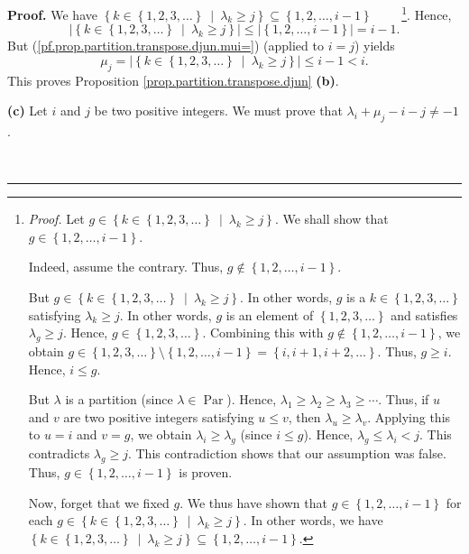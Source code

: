 \documentclass[numbers=enddot,12pt,final,onecolumn,notitlepage]{scrartcl}%
\theoremstyle{definition}
\newenvironment{proof}[1][Proof]{\noindent\textbf{#1.} }{\ \rule{0.5em}{0.5em}}
\newenvironment{verlong}{}{}
\begin{document}
\begin{verlong}
\begin{proof}
We have $\left\{  k\in\left\{  1,2,3,\ldots\right\}  \ \mid\ \lambda_{k}\geq
j\right\}  \subseteq\left\{  1,2,\ldots,i-1\right\}  $%
\ \ \ \ \footnote{\textit{Proof.} Let $g\in\left\{  k\in\left\{
1,2,3,\ldots\right\}  \ \mid\ \lambda_{k}\geq j\right\}  $. We shall show that
$g\in\left\{  1,2,\ldots,i-1\right\}  $.
\par
Indeed, assume the contrary. Thus, $g\notin\left\{  1,2,\ldots,i-1\right\}  $.
\par
But $g\in\left\{  k\in\left\{  1,2,3,\ldots\right\}  \ \mid\ \lambda_{k}\geq
j\right\}  $. In other words, $g$ is a $k\in\left\{  1,2,3,\ldots\right\}  $
satisfying $\lambda_{k}\geq j$. In other words, $g$ is an element of $\left\{
1,2,3,\ldots\right\}  $ and satisfies $\lambda_{g}\geq j$. Hence,
$g\in\left\{  1,2,3,\ldots\right\}  $. Combining this with $g\notin\left\{
1,2,\ldots,i-1\right\}  $, we obtain $g\in\left\{  1,2,3,\ldots\right\}
\setminus\left\{  1,2,\ldots,i-1\right\}  =\left\{  i,i+1,i+2,\ldots\right\}
$. Thus, $g\geq i$. Hence, $i\leq g$.
\par
But $\lambda$ is a partition (since $\lambda\in\operatorname*{Par}$). Hence,
$\lambda_{1}\geq\lambda_{2}\geq\lambda_{3}\geq\cdots$. Thus, if $u$ and $v$
are two positive integers satisfying $u\leq v$, then $\lambda_{u}\geq
\lambda_{v}$. Applying this to $u=i$ and $v=g$, we obtain $\lambda_{i}%
\geq\lambda_{g}$ (since $i\leq g$). Hence, $\lambda_{g}\leq\lambda_{i}<j$.
This contradicts $\lambda_{g}\geq j$. This contradiction shows that our
assumption was false. Thus, $g\in\left\{  1,2,\ldots,i-1\right\}  $ is proven.
\par
Now, forget that we fixed $g$. We thus have shown that $g\in\left\{
1,2,\ldots,i-1\right\}  $ for each $g\in\left\{  k\in\left\{  1,2,3,\ldots
\right\}  \ \mid\ \lambda_{k}\geq j\right\}  $. In other words, we have
$\left\{  k\in\left\{  1,2,3,\ldots\right\}  \ \mid\ \lambda_{k}\geq
j\right\}  \subseteq\left\{  1,2,\ldots,i-1\right\}  $.}. Hence,%
\[
\left\vert \left\{  k\in\left\{  1,2,3,\ldots\right\}  \ \mid\ \lambda_{k}\geq
j\right\}  \right\vert \leq\left\vert \left\{  1,2,\ldots,i-1\right\}
\right\vert =i-1.
\]
But (\ref{pf.prop.partition.transpose.djun.mui=}) (applied to $i=j$) yields%
\[
\mu_{j}=\left\vert \left\{  k\in\left\{  1,2,3,\ldots\right\}  \ \mid
\ \lambda_{k}\geq j\right\}  \right\vert \leq i-1<i.
\]
This proves Proposition \ref{prop.partition.transpose.djun} \textbf{(b)}.

\textbf{(c)} Let $i$ and $j$ be two positive integers. We must prove that
$\lambda_{i}+\mu_{j}-i-j\neq-1$.


\end{proof}
\end{verlong}
\end{document}
